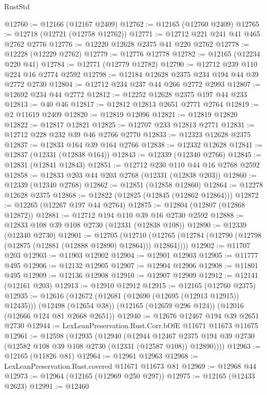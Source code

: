 \begin{lexlean}{RustStd}
\begin{coremodule}
@12760 := @12166 (@12167 @2409)
@12762 := @12165 (@12760 @2409)
@12765 := @12718 (@12721 (@12758 @12762))
@12771 := @12712 @221 @241 @41 @465 @2762 @2776
@12776 := @12220 @12628 @2375 @41 @220 @2762
@12778 := @12228 (@12229 @2762)
@12779 := @12776 @12778
@12782 := @12165 (@12234 @220 @41)
@12784 := @12771 (@12779 @12782)
@12790 := @12712 @239 @110 @224 @16 @2774 @2592
@12798 := @12184 @12628 @2375 @234 @194 @44 @39 @2772 @2730
@12804 := @12712 @234 @237 @44 @266 @2772 @2993
@12807 := @12692 @234 @44 @2772
@12812 := @12252 @12628 @2375 @197 @44 @233
@12813 := @40 @46
@12817 := @12812 @12813 @2651 @2771 @2764
@12819 := @2 @11619 @2409
@12820 := @12819 @12096
@12821 := @12819 @12820
@12822 := @12817 @12821
@12825 := @12707 @233 @12813 @2771
@12831 := @12712 @228 @232 @39 @46 @2766 @2770
@12833 := @12323 @12628 @2375
@12837 := @12833 @164 @39 @164 @2766
@12838 := @12332 @12628
@12841 := @12837 (@12331 (@12838 @164))
@12843 := @12339 (@12340 @2766)
@12845 := @12831 (@12841 @12843)
@12851 := @12712 @230 @110 @44 @16 @2768 @2592
@12858 := @12833 @203 @44 @203 @2768 (@12331 (@12838 @203))
@12860 := @12339 (@12340 @2768)
@12862 := @12851 (@12858 @12860)
@12864 := @12278 @12628 @2375
@12868 := @12822 (@12825 (@12845 (@12862 @12864)))
@12872 := @12265 (@12267 @197 @44 @2764)
@12875 := @12804 (@12807 (@12868 @12872))
@12881 := @12712 @194 @110 @39 @16 @2730 @2592
@12888 := @12833 @108 @39 @108 @2730 (@12331 (@12838 @108))
@12890 := @12339 (@12340 @2730)
@12901 := @12705
    (@12710 (@12765 (@12784 (@12790 (@12798 (@12875 (@12881 (@12888 @12890) @12864))) @12864))))
@12902 := @11707 @203
@12903 := @11903 @12902
@12904 := @12901 @12903
@12905 := @11777 @495
@12906 := @12132 @12905
@12907 := @12904 @12906
@12908 := @11801 @495
@12909 := @12136 @12908
@12910 := @12907 @12909
@12912 := @12141 (@12161 @203)
@12913 := @12910 @12912
@12915 := @12165 (@12760 @2375)
@12935 := @12616
    (@12672 (@12681 (@12690 (@12695 (@12913 @12915)) @12435)))
    (@12498 (@12654 @38))
    (@12165 (@12659 @296 @124))
    (@12016 (@12666 @124 @81 @2668 @2651))
@12940 := @12676 @12467 @194 @39 @2651 @2730
@12944 := LexLeanPreservation.Rust.Corr.bOfE @11671 @11673 @11675
@12961 := @12598
    (@12935
      (@12940
        (@12944
          @12467
          @2375
          @194
          @39
          @2730
          (@12582 @108 @39 @108 @2730 (@12331 (@12587 @108)) @12890))))
@12963 := @12165 (@11826 @81)
@12964 := @12961 @12963
@12968 := LexLeanPreservation.Rust.covered @11671 @11673 @81
@12969 := @12968 @44
@12973 := @12964 (@12165 (@12969 @250 @297))
@12975 := @12165 (@12433 @2623)
@12991 := @12460

\end{coremodule}
\end{lexlean}
